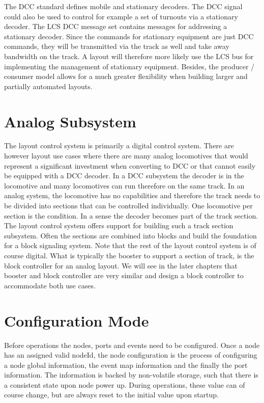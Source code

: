 The DCC standard defines mobile and stationary decoders. The DCC signal could also be used to control for example a set of turnouts via a stationary decoder. The LCS DCC  message set contains messages for addressing a stationary decoder. Since the commands for stationary equipment are just DCC commands, they will be transmitted via the track as well and take away bandwidth on the track. A layout will therefore more likely use the LCS bus for implementing the management of stationary equipment. Besides, the producer / consumer model allows for a much greater flexibility when building larger and partially automated layouts.

\section{Analog Subsystem}

The layout control system is primarily a digital control system. There are however layout use cases where there are many analog locomotives that would represent a significant investment when converting to DCC or that cannot easily be equipped with a DCC decoder. In a DCC subsystem the decoder is in the locomotive and many locomotives can run therefore on the same track. In an analog system, the locomotive has no capabilities and therefore the track needs to be divided into sections that can be controlled individually. One locomotive per section is the condition. In a sense the decoder becomes part of the track section. The layout control system offers support for building such a track section subsystem. Often the sections are combined into blocks and build the foundation for a block signaling system. Note that the rest of the layout control system is of course digital. What is typically the booster to support a section of track, is the block controller for an analog layout. We will see in the later chapters that booster and block controller are very similar and design a block controller to accommodate both use cases.

\section{Configuration Mode}

Before operations the nodes, ports and events need to be configured. Once a node has an assigned valid nodeId, the node configuration is the process of configuring a node global information, the event map information and the finally the port information. The information is backed by non-volatile storage, such that there is a consistent state upon node power up. During operations, these value can of course change, but are always reset to the initial value upon startup.


